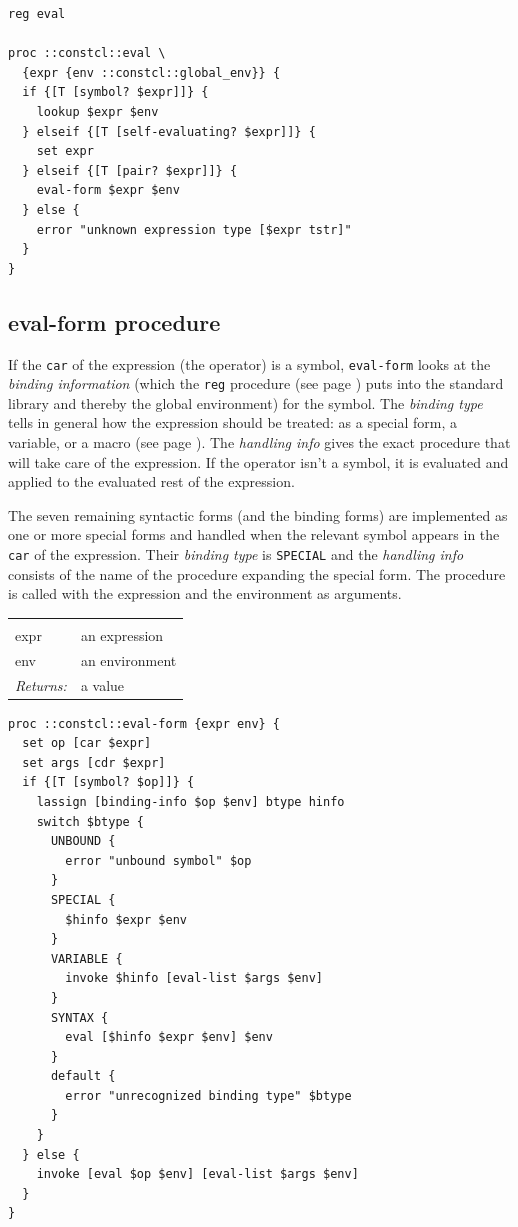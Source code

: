 \documentclass[twoside]{report}
\begin{document}
\begin{lstlisting}
reg eval

proc ::constcl::eval \
  {expr {env ::constcl::global_env}} {
  if {[T [symbol? $expr]]} {
    lookup $expr $env
  } elseif {[T [self-evaluating? $expr]]} {
    set expr
  } elseif {[T [pair? $expr]]} {
    eval-form $expr $env
  } else {
    error "unknown expression type [$expr tstr]"
  }
}
\end{lstlisting}

\subsection{eval-form procedure}
\label{evalform-procedure}

If the \texttt{car} of the expression (the operator) is a symbol, \texttt{eval-form} looks at the \emph{binding information} (which the \texttt{reg} procedure (see page \pageref{reg-procedure}) puts into the standard library and thereby the global environment) for the symbol. The \emph{binding type} tells in general how the expression should be treated: as a special form, a variable, or a macro (see page \pageref{macros}). The \emph{handling info} gives the exact procedure that will take care of the expression. If the operator isn't a symbol, it is evaluated and applied to the evaluated rest of the expression.

The seven remaining syntactic forms (and the binding forms) are implemented as one or more special forms and handled when the relevant symbol appears in the \texttt{car} of the expression. Their \emph{binding type} is \texttt{SPECIAL} and the \emph{handling info} consists of the name of the procedure expanding the special form. The procedure is called with the expression and the environment as arguments.

\noindent\begin{tabular}{ |p{1.9cm} p{8cm}| }
\hline
\rowcolor[HTML]{CCCCCC} \multicolumn{2}{|l|}{\bf eval-form (internal)} \\
expr & an expression \\
env & an environment \\
\textit{Returns:} & a value \\
\hline
\end{tabular}

\begin{lstlisting}
proc ::constcl::eval-form {expr env} {
  set op [car $expr]
  set args [cdr $expr]
  if {[T [symbol? $op]]} {
    lassign [binding-info $op $env] btype hinfo
    switch $btype {
      UNBOUND {
        error "unbound symbol" $op
      }
      SPECIAL {
        $hinfo $expr $env
      }
      VARIABLE {
        invoke $hinfo [eval-list $args $env]
      }
      SYNTAX {
        eval [$hinfo $expr $env] $env
      }
      default {
        error "unrecognized binding type" $btype
      }
    }
  } else {
    invoke [eval $op $env] [eval-list $args $env]
  }
}
\end{lstlisting}
\end{document}
